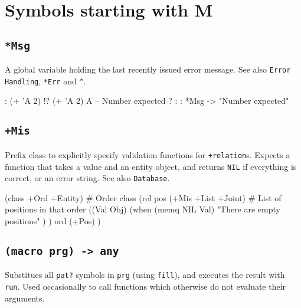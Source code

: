 %
%
%



\chapter{Symbols starting with M}
\label{cha:functions-starting-with-M}

 
\section*{\texttt{*Msg}}
\label{sec:func-ref-M-*Msg}


A global variable holding the last recently issued error message. See
also \texttt{Error Handling}, \texttt{*Err} and \texttt{\textasciicircum{}}.


\begin{wideverbatim}
: (+ 'A 2)
!? (+ 'A 2)
A -- Number expected
?
:
: *Msg
-> "Number expected"
\end{wideverbatim}

 
\section*{\texttt{+Mis}}
\label{sec:func-ref-M-+Mis}


Prefix class to explicitly specify validation functions for
\texttt{+relation}s. Expects a function that takes a value and an entity object, and returns \texttt{NIL} if everything is correct, or an error string.
See also \texttt{Database}.


\begin{wideverbatim}
(class +Ord +Entity)            # Order class
(rel pos (+Mis +List +Joint)    # List of positions in that order
   ((Val Obj)
      (when (memq NIL Val)
         "There are empty positions" ) )
   ord (+Pos) )
\end{wideverbatim}

 
\section*{\texttt{(macro prg) -> any}}
\label{sec:func-ref-M-(macro prg) -> any}


Substitues all \texttt{pat?} symbols in \texttt{prg} (using \texttt{fill}), and executes the
result with \texttt{run}. Used occasionally to call functions which otherwise
do not evaluate their arguments.


